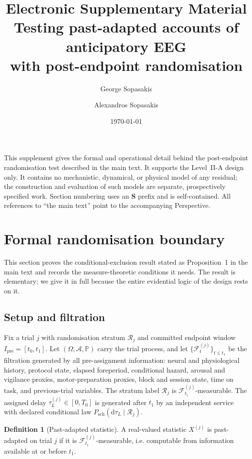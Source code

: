 \documentclass[11pt,a4paper]{article}
\title{\textbf{Electronic Supplementary Material\\[4pt]
Testing past-adapted accounts of anticipatory EEG\\[4pt] with post-endpoint randomisation}}
\author[1]{George Sopasakis}
\author[2]{Alexandros Sopasakis}
\affil[1]{Research and Development Department, Ximantis AB, Onsala, Sweden}
\affil[2]{Department of Mathematics, Lund University, Lund, Sweden}
\date{\today}
\theoremstyle{definition}
\newtheorem{definition}{Definition}
\newcommand{\F}{\mathcal{F}}
\newcommand{\tauL}{\tau_L}
\begin{document}
\maketitle

\noindent
This supplement gives the formal and operational detail behind the
post-endpoint randomisation test described in the main text. It supports the
Level~II-A design only. It contains no mechanistic, dynamical, or physical model
of any residual; the construction and evaluation of such models are separate,
prospectively specified work. Section numbering uses an \textbf{S} prefix and is
self-contained. All references to ``the main text'' point to the accompanying
Perspective.

\tableofcontents
\bigskip

\section{Formal randomisation boundary}
\label{sec:si-randomisation-boundary}

This section proves the conditional-exclusion result stated as
Proposition~1 in the main text and records the measure-theoretic conditions it
needs. The result is elementary; we give it in full because the entire
evidential logic of the design rests on it.

\subsection{Setup and filtration}
\label{sec:si-filtration}

Fix a trial \(j\) with randomisation stratum \(\mathcal{R}_j\) and committed
endpoint window \(I_{\mathrm{pre}}=[t_0,t_1]\). Let
\((\Omega,\mathcal{A},\mathbb{P})\) carry the trial process, and let
\(\{\F_t^{(j)}\}_{t\le t_1}\) be the filtration generated by all
pre-assignment information: neural and physiological history, protocol state,
elapsed foreperiod, conditional hazard, arousal and vigilance proxies,
motor-preparation proxies, block and session state, time on task, and
previous-trial variables. The stratum label \(\mathcal{R}_j\) is
\(\F_{t_1}^{(j)}\)-measurable. The assigned delay
\(\tauL^{(j)}\in[0,T_0]\) is generated after \(t_1\) by an independent service
with declared conditional law
\(P_{\mathrm{sch}}(\mathrm{d}\tauL\mid\mathcal{R}_j)\).

\begin{definition}[Past-adapted statistic]
\label{def:past-adapted}
A real-valued statistic \(X^{(j)}\) is past-adapted on trial \(j\) if it is
\(\F_{t_1}^{(j)}\)-measurable, i.e. computable from information available at or
before \(t_1\).
\end{definition}
\end{document}
